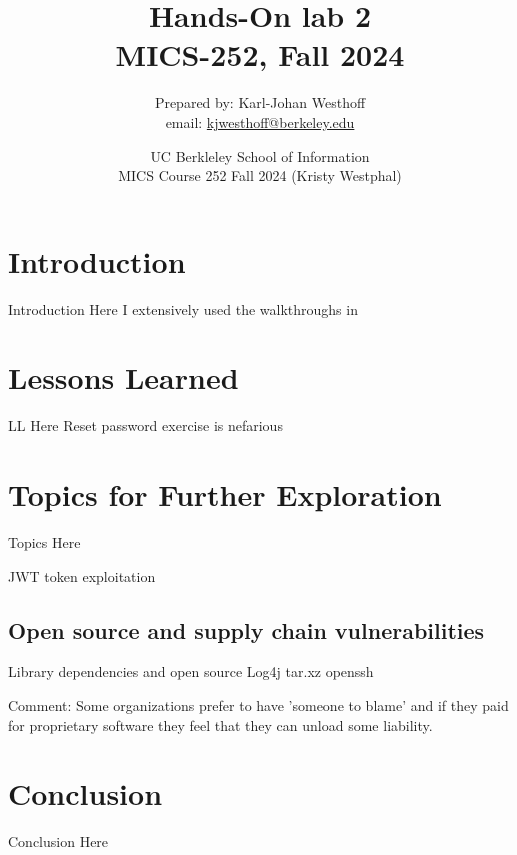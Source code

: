 \documentclass[
	letterpaper, %
	10pt, %
	unnumberedsections, %
	twoside, %
]{APAAssignment}
\title{Hands-On lab 2 \\ MICS-252, Fall 2024} %
\date{UC Berkleley School of Information \\
MICS Course 252 Fall 2024 (Kristy Westphal)
}
\author{
	Prepared by: Karl-Johan Westhoff \\
	email: \href{mailto:kjwesthoff@berkeley.edu}{kjwesthoff@berkeley.edu}
}
\begin{document}
\onecolumn
\maketitle %


\section{Introduction}
Introduction Here
I extensively used the walkthroughs in \cite{CycubicsDocsWebGoat}

\section{Lessons Learned}
LL Here
Reset password exercise is nefarious


\section{Topics for Further Exploration}
Topics Here

JWT token exploitation


\subsection{Open source and supply chain vulnerabilities}
Library dependencies and open source
Log4j
tar.xz
openssh

Comment:
Some organizations prefer to have 'someone to blame' and if they paid for proprietary software they feel that they can unload some liability.


\section{Conclusion}
Conclusion Here

\clearpage
\printbibliography %

\end{document}
